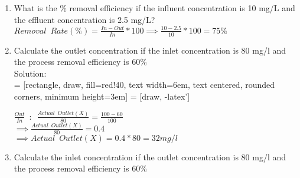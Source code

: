 \begin{enumerate}

\item What is the \% removal efficiency if the influent concentration is 10 mg/L and the effluent concentration is 2.5 mg/L?\\
$Removal \enspace Rate (\%) = \frac{In-Out}{In}*100 \implies \frac{10-2.5}{10}*100=\boxed{75\%}$



\item Calculate the outlet concentration if the inlet concentration is 80 mg/l and the process removal efficiency is 60\%\\
Solution:\\

 = [rectangle, draw, fill=red!40, 
    text width=6em, text centered, rounded corners, minimum height=3em]
 = [draw, -latex']
\begin{figure}[!h]
\centering
{}
\end{figure}

$\frac{Out}{In} \enspace:\enspace\frac{Actual \enspace Outlet (X)}{80}=\frac{100-60}{100}$\\
$\implies \frac{Actual \enspace Outlet (X)}{80} =0.4$\\
$\implies Actual \enspace  Outlet (X) = 0.4 * 80 = \boxed{32 mg/l}$\\


\item Calculate the inlet concentration if the outlet concentration is 80 mg/l and the process removal efficiency is 60\%\\


\end{enumerate}
